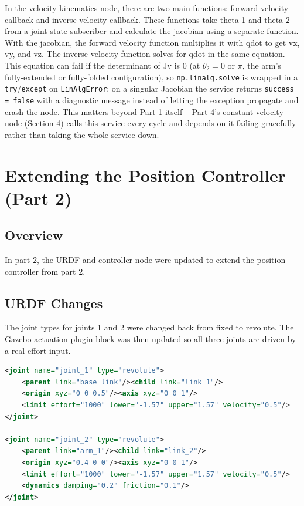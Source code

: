 \documentclass[12pt]{article}
\begin{document}
In the velocity kinematics node, there are two main functions: forward velocity callback and inverse velocity callback.
These functions take theta 1 and theta 2 from a joint state subscriber and calculate the jacobian using a separate function.
With the jacobian, the forward velocity function multiplies it with qdot to get vx, vy, and vz.
The inverse velocity function solves for qdot in the same equation. This equation can fail if the determinant of Jv is 0
(at $\theta_2 = 0$ or $\pi$, the arm's fully-extended or fully-folded configuration), so \texttt{np.linalg.solve} is
wrapped in a \texttt{try}/\texttt{except} on \texttt{LinAlgError}: on a singular Jacobian the service returns
\texttt{success = false} with a diagnostic message instead of letting the exception propagate and crash the node. This
matters beyond Part 1 itself -- Part 4's constant-velocity node (Section 4) calls this service every cycle and depends
on it failing gracefully rather than taking the whole service down.

\section{Extending the Position Controller (Part 2)}

\subsection{Overview}

In part 2, the URDF and controller node were updated to extend the position controller from part 2.

\subsection{URDF Changes}

The joint types for joints 1 and 2 were changed back from fixed to revolute. The Gazebo actuation
plugin block was then updated so all three joints are driven by a real effort input.

\begin{lstlisting}[style=ros, language=XML,
    caption={joint\_1 and joint\_2 reverted to revolute}]
<joint name="joint_1" type="revolute">
    <parent link="base_link"/><child link="link_1"/>
    <origin xyz="0 0 0.5"/><axis xyz="0 0 1"/>
    <limit effort="1000" lower="-1.57" upper="1.57" velocity="0.5"/>
</joint>

<joint name="joint_2" type="revolute">
    <parent link="arm_1"/><child link="link_2"/>
    <origin xyz="0.4 0 0"/><axis xyz="0 0 1"/>
    <limit effort="1000" lower="-1.57" upper="1.57" velocity="0.5"/>
    <dynamics damping="0.2" friction="0.1"/>
</joint>
\end{lstlisting}
\end{document}
